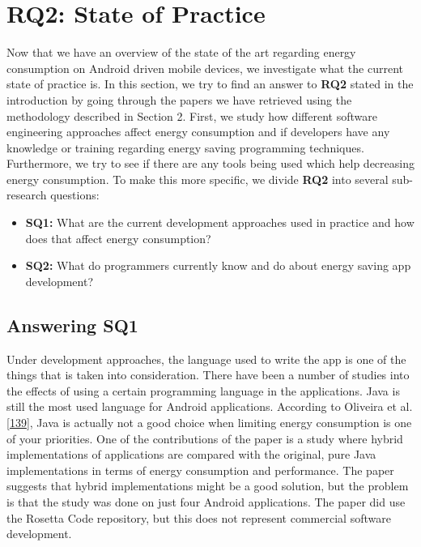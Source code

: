 \documentclass[]{book}
\providecommand{\tightlist}{%
  \setlength{\itemsep}{0pt}\setlength{\parskip}{0pt}}
\begin{document}
\section{RQ2: State of Practice}\label{rq2-state-of-practice}

Now that we have an overview of the state of the art regarding energy
consumption on Android driven mobile devices, we investigate what the
current state of practice is. In this section, we try to find an answer
to \textbf{RQ2} stated in the introduction by going through the papers
we have retrieved using the methodology described in Section 2. First,
we study how different software engineering approaches affect energy
consumption and if developers have any knowledge or training regarding
energy saving programming techniques. Furthermore, we try to see if
there are any tools being used which help decreasing energy consumption.
To make this more specific, we divide \textbf{RQ2} into several
sub-research questions:

\begin{itemize}
\tightlist
\item
  \textbf{SQ1:} What are the current development approaches used in
  practice and how does that affect energy consumption?
\item
  \textbf{SQ2:} What do programmers currently know and do about energy
  saving app development?
\end{itemize}

\subsection{Answering SQ1}\label{answering-sq1}

Under development approaches, the language used to write the app is one
of the things that is taken into consideration. There have been a number
of studies into the effects of using a certain programming language in
the applications. Java is still the most used language for Android
applications. According to Oliveira et al.
{[}\protect\hyperlink{ref-OOC2017}{139}{]}, Java is actually not a good
choice when limiting energy consumption is one of your priorities. One
of the contributions of the paper is a study where hybrid
implementations of applications are compared with the original, pure
Java implementations in terms of energy consumption and performance. The
paper suggests that hybrid implementations might be a good solution, but
the problem is that the study was done on just four Android
applications. The paper did use the Rosetta Code repository, but this
does not represent commercial software development.
\end{document}

